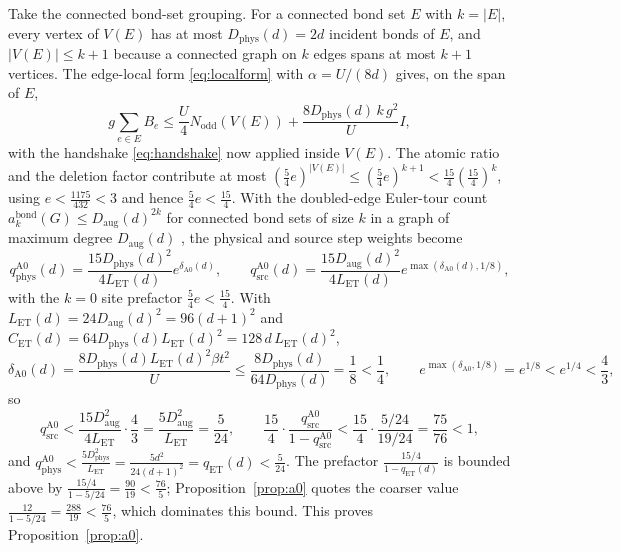 \documentclass[11pt]{article}
\theoremstyle{plain}
\theoremstyle{definition}
\newcommand{\Nodd}{N_{\mathrm{odd}}}
\newcommand{\Dphys}{D_{\mathrm{phys}}}
\newcommand{\Daug}{D_{\mathrm{aug}}}
\begin{document}
Take the connected bond-set grouping. For a connected bond set $E$ with $k=|E|$, every
vertex of $V(E)$ has at most $\Dphys(d)=2d$ incident bonds of $E$, and
$|V(E)|\le k+1$ because a connected graph on $k$ edges spans at most $k+1$ vertices.
The edge-local form \eqref{eq:localform} with $\alpha=U/(8d)$ gives, on the span of
$E$,
\[
 g\sum_{e\in E}B_e\le\frac U4\Nodd(V(E))+\frac{8\Dphys(d)\,k\,g^2}{U}I,
\]
with the handshake \eqref{eq:handshake} now applied inside $V(E)$. The atomic ratio
and the deletion factor contribute at most $(\frac54e)^{|V(E)|}\le(\frac54e)^{k+1}<\frac{15}{4}(\frac{15}{4})^k$,
using $e<\frac{1175}{432}<3$ and hence $\frac54e<\frac{15}{4}$. With the doubled-edge
Euler-tour count $a_k^{\mathrm{bond}}(G)\le\Daug(d)^{2k}$ for connected bond sets of
size $k$ in a graph of maximum degree $\Daug(d)$ \cite{rens2d}, the physical and
source step weights become
\begin{equation}\label{eq:a0weights}
 q_{\mathrm{phys}}^{\mathrm{A0}}(d)=\frac{15\Dphys(d)^2}{4L_{\mathrm{ET}}(d)}e^{\delta_{\mathrm{A0}}(d)},
 \qquad
 q_{\mathrm{src}}^{\mathrm{A0}}(d)=\frac{15\Daug(d)^2}{4L_{\mathrm{ET}}(d)}e^{\max(\delta_{\mathrm{A0}}(d),1/8)},
\end{equation}
with the $k=0$ site prefactor $\frac54e<\frac{15}{4}$. With
$L_{\mathrm{ET}}(d)=24\Daug(d)^2=96(d+1)^2$ and
$C_{\mathrm{ET}}(d)=64\Dphys(d)L_{\mathrm{ET}}(d)^2=128\,d\,L_{\mathrm{ET}}(d)^2$,
\begin{equation}\label{eq:a0delta}
 \delta_{\mathrm{A0}}(d)=\frac{8\Dphys(d)L_{\mathrm{ET}}(d)^2\beta t^2}{U}
 \le\frac{8\Dphys(d)}{64\Dphys(d)}=\frac18<\frac14,
 \qquad e^{\max(\delta_{\mathrm{A0}},1/8)}=e^{1/8}<e^{1/4}<\frac43,
\end{equation}
so
\begin{equation}\label{eq:a0decay}
 q_{\mathrm{src}}^{\mathrm{A0}}<\frac{15\Daug^2}{4L_{\mathrm{ET}}}\cdot\frac43
 =\frac{5\Daug^2}{L_{\mathrm{ET}}}=\frac5{24},
 \qquad
 \frac{15}{4}\cdot\frac{q_{\mathrm{src}}^{\mathrm{A0}}}{1-q_{\mathrm{src}}^{\mathrm{A0}}}
 <\frac{15}{4}\cdot\frac{5/24}{19/24}=\frac{75}{76}<1,
\end{equation}
and $q_{\mathrm{phys}}^{\mathrm{A0}}<\frac{5\Dphys^2}{L_{\mathrm{ET}}}=\frac{5d^2}{24(d+1)^2}=q_{\mathrm{ET}}(d)<\frac5{24}$.
The prefactor $\frac{15/4}{1-q_{\mathrm{ET}}(d)}$ is bounded above by
$\frac{15/4}{1-5/24}=\frac{90}{19}<\frac{76}{5}$; Proposition~\ref{prop:a0} quotes the
coarser value $\frac{12}{1-5/24}=\frac{288}{19}<\frac{76}{5}$, which dominates this bound.
This proves Proposition~\ref{prop:a0}.
\end{document}
